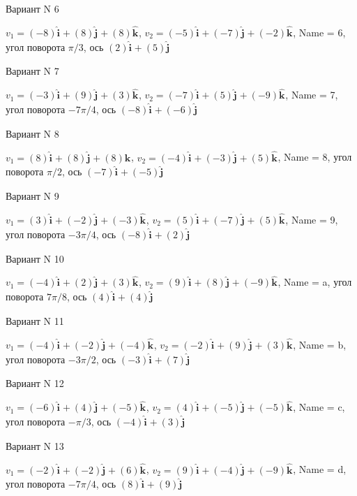 \documentclass[11pt]{report}
\begin{document}
Вариант N 6

$v_1 = (-8)\mathbf{\hat{i}_{}} + (8)\mathbf{\hat{j}_{}} + (8)\mathbf{\hat{k}_{}}$, $v_2 = (-5)\mathbf{\hat{i}_{}} + (-7)\mathbf{\hat{j}_{}} + (-2)\mathbf{\hat{k}_{}}$, Name = 6, угол поворота $\pi / 3$, ось $(2)\mathbf{\hat{i}_{}} + (5)\mathbf{\hat{j}_{}}$

Вариант N 7

$v_1 = (-3)\mathbf{\hat{i}_{}} + (9)\mathbf{\hat{j}_{}} + (3)\mathbf{\hat{k}_{}}$, $v_2 = (-7)\mathbf{\hat{i}_{}} + (5)\mathbf{\hat{j}_{}} + (-9)\mathbf{\hat{k}_{}}$, Name = 7, угол поворота $- 7 \pi / 4$, ось $(-8)\mathbf{\hat{i}_{}} + (-6)\mathbf{\hat{j}_{}}$

Вариант N 8

$v_1 = (8)\mathbf{\hat{i}_{}} + (8)\mathbf{\hat{j}_{}} + (8)\mathbf{\hat{k}_{}}$, $v_2 = (-4)\mathbf{\hat{i}_{}} + (-3)\mathbf{\hat{j}_{}} + (5)\mathbf{\hat{k}_{}}$, Name = 8, угол поворота $\pi / 2$, ось $(-7)\mathbf{\hat{i}_{}} + (-5)\mathbf{\hat{j}_{}}$

Вариант N 9

$v_1 = (3)\mathbf{\hat{i}_{}} + (-2)\mathbf{\hat{j}_{}} + (-3)\mathbf{\hat{k}_{}}$, $v_2 = (5)\mathbf{\hat{i}_{}} + (-7)\mathbf{\hat{j}_{}} + (5)\mathbf{\hat{k}_{}}$, Name = 9, угол поворота $- 3 \pi / 4$, ось $(-8)\mathbf{\hat{i}_{}} + (2)\mathbf{\hat{j}_{}}$

Вариант N 10

$v_1 = (-4)\mathbf{\hat{i}_{}} + (2)\mathbf{\hat{j}_{}} + (3)\mathbf{\hat{k}_{}}$, $v_2 = (9)\mathbf{\hat{i}_{}} + (8)\mathbf{\hat{j}_{}} + (-9)\mathbf{\hat{k}_{}}$, Name = a, угол поворота $7 \pi / 8$, ось $(4)\mathbf{\hat{i}_{}} + (4)\mathbf{\hat{j}_{}}$

Вариант N 11

$v_1 = (-4)\mathbf{\hat{i}_{}} + (-2)\mathbf{\hat{j}_{}} + (-4)\mathbf{\hat{k}_{}}$, $v_2 = (-2)\mathbf{\hat{i}_{}} + (9)\mathbf{\hat{j}_{}} + (3)\mathbf{\hat{k}_{}}$, Name = b, угол поворота $- 3 \pi / 2$, ось $(-3)\mathbf{\hat{i}_{}} + (7)\mathbf{\hat{j}_{}}$

Вариант N 12

$v_1 = (-6)\mathbf{\hat{i}_{}} + (4)\mathbf{\hat{j}_{}} + (-5)\mathbf{\hat{k}_{}}$, $v_2 = (4)\mathbf{\hat{i}_{}} + (-5)\mathbf{\hat{j}_{}} + (-5)\mathbf{\hat{k}_{}}$, Name = c, угол поворота $- \pi / 3$, ось $(-4)\mathbf{\hat{i}_{}} + (3)\mathbf{\hat{j}_{}}$

Вариант N 13

$v_1 = (-2)\mathbf{\hat{i}_{}} + (-2)\mathbf{\hat{j}_{}} + (6)\mathbf{\hat{k}_{}}$, $v_2 = (9)\mathbf{\hat{i}_{}} + (-4)\mathbf{\hat{j}_{}} + (-9)\mathbf{\hat{k}_{}}$, Name = d, угол поворота $- 7 \pi / 4$, ось $(8)\mathbf{\hat{i}_{}} + (9)\mathbf{\hat{j}_{}}$
\end{document}
